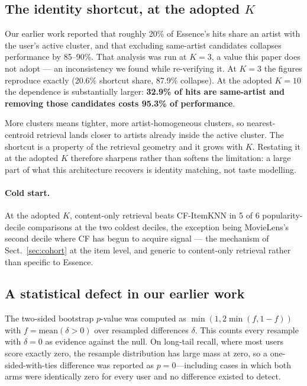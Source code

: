 \documentclass[runningheads]{llncs}
\begin{document}
\subsection{The identity shortcut, at the adopted \texorpdfstring{$K$}{K}}\label{sec:shortcut}

Our earlier work reported that roughly 20\% of Essence's hits share an artist with the user's
active cluster, and that excluding same-artist candidates collapses performance by 85--90\%.
That analysis was run at $K = 3$, a value this paper does not adopt --- an inconsistency we
found while re-verifying it. At $K = 3$ the figures reproduce exactly (20.6\% shortcut share,
87.9\% collapse). At the adopted $K = 10$ the dependence is substantially larger:
\textbf{32.9\% of hits are same-artist and removing those candidates costs 95.3\% of
performance}.

More clusters means tighter, more artist-homogeneous clusters, so nearest-centroid retrieval
lands closer to artists already inside the active cluster. The shortcut is a property of the
retrieval geometry and it grows with $K$. Restating it at the adopted $K$ therefore sharpens
rather than softens the limitation: a large part of what this architecture recovers is
identity matching, not taste modelling.

\paragraph{Cold start.}\label{sec:cold} At the adopted $K$, content-only retrieval beats
CF-ItemKNN in 5 of 6 popularity-decile comparisons at the two coldest deciles, the exception
being MovieLens's second decile where CF has begun to acquire signal --- the mechanism of
Sect.~\ref{sec:cohort} at the item level, and generic to content-only retrieval rather than
specific to Essence.

\subsection{A statistical defect in our earlier work}\label{sec:bug}

The two-sided bootstrap $p$-value was computed as $\min(1, 2\min(f, 1-f))$ with
$f = \mathrm{mean}(\delta > 0)$ over resampled differences $\delta$. This counts every
resample with $\delta = 0$ as evidence against the null. On long-tail recall, where most
users score exactly zero, the resample distribution has large mass at zero, so a
one-sided-with-ties difference was reported as $p = 0$---including cases in which both arms
were identically zero for every user and no difference existed to detect.
\end{document}
